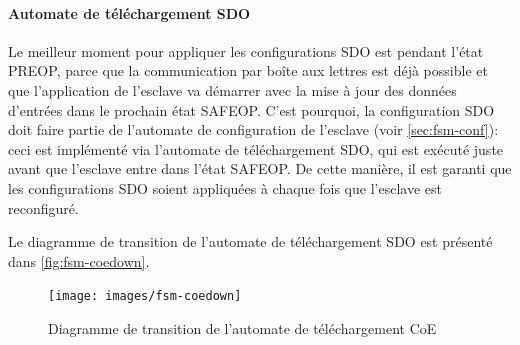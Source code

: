\documentclass[a4paper,12pt,BCOR=6mm,bibtotoc,idxtotoc]{scrbook}
\begin{document}
\paragraph{Automate de t\'el\'echargement SDO}

Le meilleur moment pour appliquer les configurations SDO est pendant
l'\'etat PREOP, parce que la communication par bo\^ite aux lettres est
d\'ej\`a possible et que l'application de l'esclave va d\'emarrer avec
la mise \`a jour des donn\'ees d'entr\'ees dans le prochain \'etat
SAFEOP.  C'est pourquoi, la configuration SDO doit faire partie de
l'automate de configuration de l'esclave (voir
\autoref{sec:fsm-conf}): ceci est impl\'ement\'e via l'automate de
t\'el\'echargement SDO, qui est ex\'ecut\'e juste avant que l'esclave
entre dans l'\'etat SAFEOP.  De cette mani\`ere, il est garanti que
les configurations SDO soient appliqu\'ees \`a chaque fois que l'esclave
est reconfigur\'e.

Le diagramme de transition de l'automate de t\'el\'echargement SDO est
pr\'esent\'e dans \autoref{fig:fsm-coedown}.

\begin{figure}[htbp]
  \centering
  \texttt{[image: images/fsm-coedown]} %
  \caption{Diagramme de transition de l'automate de t\'el\'echargement CoE}
  \label{fig:fsm-coedown}
\end{figure}

\end{document}
